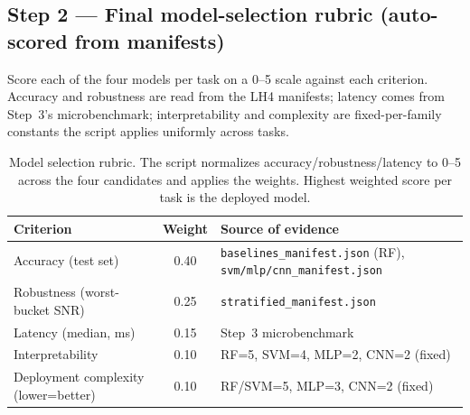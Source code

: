 \documentclass[11pt,letterpaper]{article}
\begin{document}
\subsection{Step 2 --- Final model-selection rubric (auto-scored from manifests)}
Score each of the four models per task on a 0--5 scale against each criterion. Accuracy and robustness are read from the LH4 manifests; latency comes from Step~3's microbenchmark; interpretability and complexity are fixed-per-family constants the script applies uniformly across tasks.

\begin{table}[h!]
	\centering
	\renewcommand{\arraystretch}{1.4}
	\begin{tabularx}{\textwidth}{l c X}
		\toprule
		\textbf{Criterion} & \textbf{Weight} & \textbf{Source of evidence} \\
		\midrule
		Accuracy (test set)            & 0.40 & \texttt{baselines\_manifest.json} (RF), \texttt{svm/mlp/cnn\_manifest.json} \\
		Robustness (worst-bucket SNR)  & 0.25 & \texttt{stratified\_manifest.json} \\
		Latency (median, ms)           & 0.15 & Step~3 microbenchmark \\
		Interpretability               & 0.10 & RF=5, SVM=4, MLP=2, CNN=2 (fixed) \\
		Deployment complexity (lower=better) & 0.10 & RF/SVM=5, MLP=3, CNN=2 (fixed) \\
		\bottomrule
	\end{tabularx}
	\caption{Model selection rubric. The script normalizes accuracy/robustness/latency to 0--5 across the four candidates and applies the weights. Highest weighted score per task is the deployed model.}
\end{table}
\end{document}
